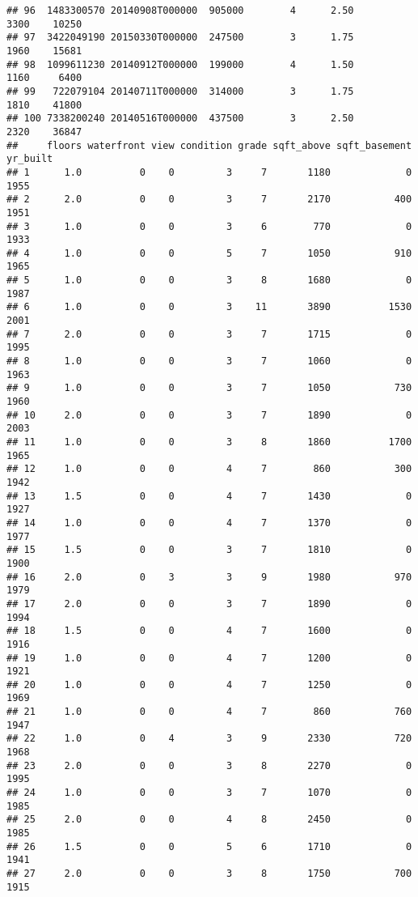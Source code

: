 \documentclass[
]{article}
\begin{document}
\begin{verbatim}
## 96  1483300570 20140908T000000  905000        4      2.50        3300    10250
## 97  3422049190 20150330T000000  247500        3      1.75        1960    15681
## 98  1099611230 20140912T000000  199000        4      1.50        1160     6400
## 99   722079104 20140711T000000  314000        3      1.75        1810    41800
## 100 7338200240 20140516T000000  437500        3      2.50        2320    36847
##     floors waterfront view condition grade sqft_above sqft_basement yr_built
## 1      1.0          0    0         3     7       1180             0     1955
## 2      2.0          0    0         3     7       2170           400     1951
## 3      1.0          0    0         3     6        770             0     1933
## 4      1.0          0    0         5     7       1050           910     1965
## 5      1.0          0    0         3     8       1680             0     1987
## 6      1.0          0    0         3    11       3890          1530     2001
## 7      2.0          0    0         3     7       1715             0     1995
## 8      1.0          0    0         3     7       1060             0     1963
## 9      1.0          0    0         3     7       1050           730     1960
## 10     2.0          0    0         3     7       1890             0     2003
## 11     1.0          0    0         3     8       1860          1700     1965
## 12     1.0          0    0         4     7        860           300     1942
## 13     1.5          0    0         4     7       1430             0     1927
## 14     1.0          0    0         4     7       1370             0     1977
## 15     1.5          0    0         3     7       1810             0     1900
## 16     2.0          0    3         3     9       1980           970     1979
## 17     2.0          0    0         3     7       1890             0     1994
## 18     1.5          0    0         4     7       1600             0     1916
## 19     1.0          0    0         4     7       1200             0     1921
## 20     1.0          0    0         4     7       1250             0     1969
## 21     1.0          0    0         4     7        860           760     1947
## 22     1.0          0    4         3     9       2330           720     1968
## 23     2.0          0    0         3     8       2270             0     1995
## 24     1.0          0    0         3     7       1070             0     1985
## 25     2.0          0    0         4     8       2450             0     1985
## 26     1.5          0    0         5     6       1710             0     1941
## 27     2.0          0    0         3     8       1750           700     1915

\end{verbatim}
\end{document}

